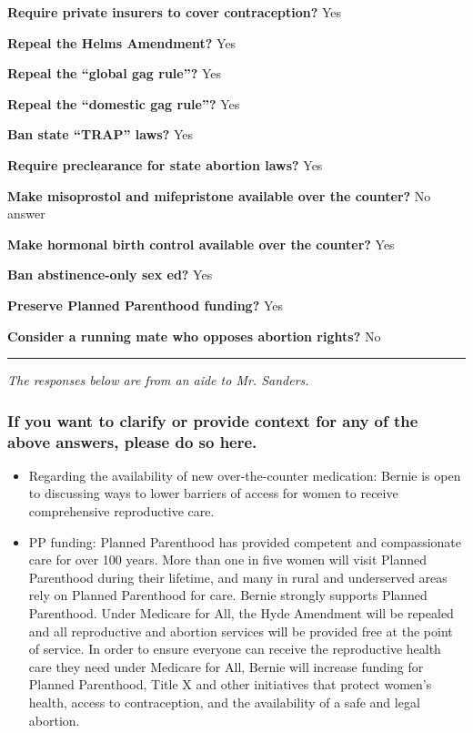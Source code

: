 \textbf{Require private insurers to cover contraception?} Yes

\textbf{Repeal the Helms Amendment?} Yes

\textbf{Repeal the ``global gag rule''?} Yes

\textbf{Repeal the ``domestic gag rule''?} Yes

\textbf{Ban state ``TRAP'' laws?} Yes

\textbf{Require preclearance for state abortion laws?} Yes

\textbf{Make misoprostol and mifepristone available over the counter?}
No answer

\textbf{Make hormonal birth control available over the counter?} Yes

\textbf{Ban abstinence-only sex ed?} Yes

\textbf{Preserve Planned Parenthood funding?} Yes

\textbf{Consider a running mate who opposes abortion rights?} No

\begin{center}\rule{0.5\linewidth}{\linethickness}\end{center}

\emph{The responses below are from an aide to Mr. Sanders.}

\hypertarget{if-you-want-to-clarify-or-provide-context-for-any-of-the-above-answers-please-do-so-here-4}{%
\subsubsection{If you want to clarify or provide context for any of the
above answers, please do so
here.}\label{if-you-want-to-clarify-or-provide-context-for-any-of-the-above-answers-please-do-so-here-4}}

\begin{itemize}
\item
  Regarding the availability of new over-the-counter medication: Bernie
  is open to discussing ways to lower barriers of access for women to
  receive comprehensive reproductive care.
\item
  PP funding: Planned Parenthood has provided competent and
  compassionate care for over 100 years. More than one in five women
  will visit Planned Parenthood during their lifetime, and many in rural
  and underserved areas rely on Planned Parenthood for care. Bernie
  strongly supports Planned Parenthood. Under Medicare for All, the Hyde
  Amendment will be repealed and all reproductive and abortion services
  will be provided free at the point of service. In order to ensure
  everyone can receive the reproductive health care they need under
  Medicare for All, Bernie will increase funding for Planned Parenthood,
  Title X and other initiatives that protect women's health, access to
  contraception, and the availability of a safe and legal abortion.
\end{itemize}

